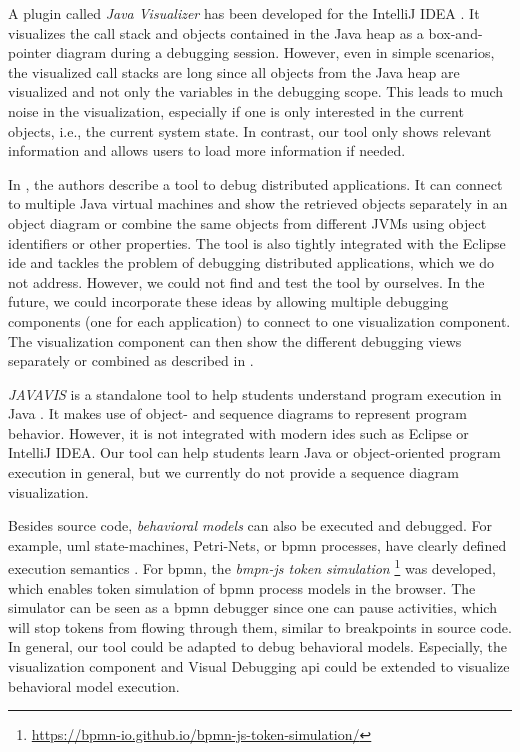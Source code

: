 \documentclass[conference]{IEEEtran}
\newcommand{\intellij}{IntelliJ IDEA}
\begin{document}
A plugin called \textit{Java Visualizer} has been developed for the \intellij{} \cite{JavaVisualizerIntelliJ}.
It visualizes the call stack and objects contained in the Java heap as a box-and-pointer diagram during a debugging session.
However, even in simple scenarios, the visualized call stacks are long since all objects from the Java heap are visualized and not only the variables in the debugging scope.
This leads to much noise in the visualization, especially if one is only interested in the current objects, i.e., the current system state.
In contrast, our tool only shows relevant information and allows users to load more information if needed.

In \cite{kochGraphicalDebuggingDistributed2015}, the authors describe a tool to debug distributed applications.
It can connect to multiple Java virtual machines and show the retrieved objects separately in an object diagram or combine the same objects from different JVMs using object identifiers or other properties.
The tool is also tightly integrated with the Eclipse \gls*{ide} and tackles the problem of debugging distributed applications, which we do not address.
However, we could not find and test the tool by ourselves.
In the future, we could incorporate these ideas by allowing multiple debugging components (one for each application) to connect to one visualization component.
The visualization component can then show the different debugging views separately or combined as described in \cite{kochGraphicalDebuggingDistributed2015}.

\textit{JAVAVIS} is a standalone tool to help students understand program execution in Java \cite{oechsleJAVAVISAutomaticProgram2002}.
It makes use of object- and sequence diagrams to represent program behavior.
However, it is not integrated with modern \glspl*{ide} such as Eclipse or \intellij{}.
Our tool can help students learn Java or object-oriented program execution in general, but we currently do not provide a sequence diagram visualization.

Besides source code, \textit{behavioral models} can also be executed and debugged.
For example, \gls*{uml} state-machines, Petri-Nets, or \gls*{bpmn} processes, have clearly defined execution semantics \cite{objectmanagementgroupUnifiedModelingLanguage2017, objectmanagementgroupBusinessProcessModel2013}.
For \gls*{bpmn}, the \textit{bmpn-js token simulation} \footnote{\url{https://bpmn-io.github.io/bpmn-js-token-simulation/}} was developed, which enables token simulation of \gls*{bpmn} process models in the browser.
The simulator can be seen as a \gls*{bpmn} debugger since one can pause activities, which will stop tokens from flowing through them, similar to breakpoints in source code.
In general, our tool could be adapted to debug behavioral models.
Especially, the visualization component and Visual Debugging \gls*{api} could be extended to visualize behavioral model execution.
\end{document}
